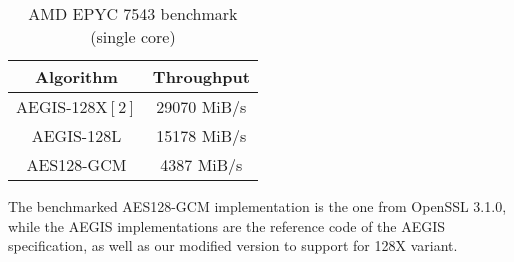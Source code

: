 \documentclass[envcountsame,runningheads,notitlepage]{llncs}
\begin{document}
\begin{table}
  \begin{center}
    \begin{tabular}{|c|c|}
      \hline
      Algorithm       & Throughput  \\
      \hline
      AEGIS-128X$[2]$ & 29070 MiB/s \\
      \hline
      AEGIS-128L      & 15178 MiB/s \\
      \hline
      AES128-GCM      & 4387 MiB/s  \\
      \hline
    \end{tabular}
\caption{\label{epyc-7543}AMD EPYC 7543 benchmark (single core)}
  \end{center}
\end{table}

The benchmarked AES128-GCM implementation is the one from OpenSSL 3.1.0, while the AEGIS implementations are the reference code of the AEGIS specification, as well as our modified version to support for 128X variant.

\ifnum{}
  
\else
  
\fi

\end{document}
